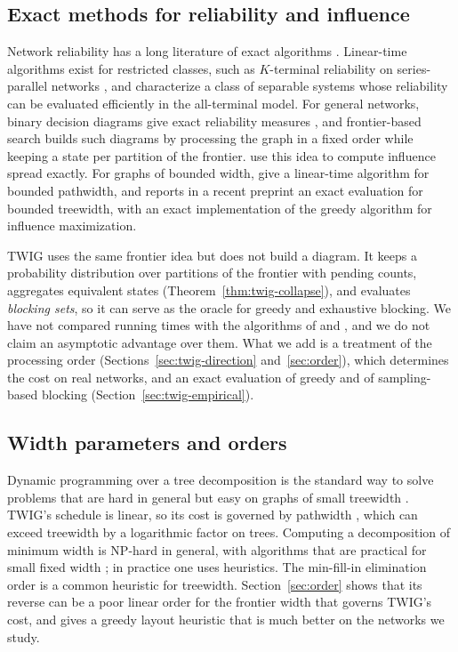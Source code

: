 \documentclass[preprint,11pt]{elsarticle}
\theoremstyle{definition}
\theoremstyle{remark}
\begin{document}
\subsection{Exact methods for reliability and influence}

Network reliability has a long literature of exact algorithms \citep{colbourn1987}. Linear-time algorithms exist for restricted classes, such as $K$-terminal reliability on series-parallel networks \citep{satyanarayana1985}, and \citet{cancela2021} characterize a class of separable systems whose reliability can be evaluated efficiently in the all-terminal model. For general networks, binary decision diagrams give exact reliability measures \citep{hardy2007}, and frontier-based search \citep{kawahara2017} builds such diagrams by processing the graph in a fixed order while keeping a state per partition of the frontier. \citet{maehara2017} use this idea to compute influence spread exactly. For graphs of bounded width, \citet{nakamura2026} give a linear-time algorithm for bounded pathwidth, and \citet{pozar2026} reports in a recent preprint an exact evaluation for bounded treewidth, with an exact implementation of the greedy algorithm for influence maximization.

TWIG uses the same frontier idea but does not build a diagram. It keeps a probability distribution over partitions of the frontier with pending counts, aggregates equivalent states (Theorem~\ref{thm:twig-collapse}), and evaluates \emph{blocking sets}, so it can serve as the oracle for greedy and exhaustive blocking. We have not compared running times with the algorithms of \citet{nakamura2026} and \citet{pozar2026}, and we do not claim an asymptotic advantage over them. What we add is a treatment of the processing order (Sections~\ref{sec:twig-direction} and~\ref{sec:order}), which determines the cost on real networks, and an exact evaluation of greedy and of sampling-based blocking (Section~\ref{sec:twig-empirical}).

\subsection{Width parameters and orders}

Dynamic programming over a tree decomposition is the standard way to solve problems that are hard in general but easy on graphs of small treewidth \citep{bodlaender1988,cygan2015}. TWIG's schedule is linear, so its cost is governed by pathwidth \citep{kinnersley1992}, which can exceed treewidth by a logarithmic factor on trees. Computing a decomposition of minimum width is NP-hard in general, with algorithms that are practical for small fixed width \citep{bodlaender1996,cygan2015}; in practice one uses heuristics. The min-fill-in elimination order is a common heuristic for treewidth. Section~\ref{sec:order} shows that its reverse can be a poor linear order for the frontier width that governs TWIG's cost, and gives a greedy layout heuristic that is much better on the networks we study.
\end{document}
